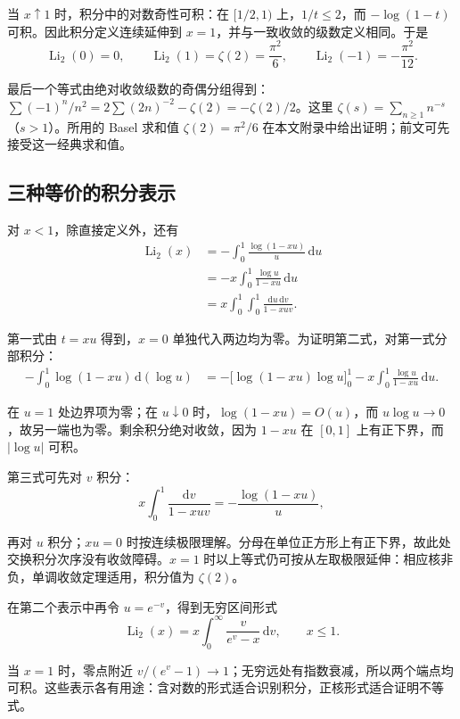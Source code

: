 \documentclass[11pt,a4paper]{article}
\begin{document}
当 \(x\uparrow1\) 时，积分中的对数奇性可积：在 \([1/2,1)\)
上，\(1/t\leqslant2\)，而 \(-\log(1-t)\) 可积。因此积分定义连续延伸到
\(x=1\)，并与一致收敛的级数定义相同。于是
\[
\operatorname{Li}_2(0)=0,\qquad
\operatorname{Li}_2(1)=\zeta(2)=\frac{\pi^2}{6},\qquad
\operatorname{Li}_2(-1)=-\frac{\pi^2}{12}.
\]

最后一个等式由绝对收敛级数的奇偶分组得到：\(\sum(-1)^n/n^2=2\sum(2n)^{-2}-\zeta(2)=-\zeta(2)/2\)。这里
\(\zeta(s)=\sum_{n\geqslant1}n^{-s}\)（\(s>1\)）。所用的 Basel 求和值
\(\zeta(2)=\pi^2/6\) 在本文附录中给出证明；前文可先接受这一经典求和值。

\hypertarget{ux4e09ux79cdux7b49ux4ef7ux7684ux79efux5206ux8868ux793a}{%
\subsection{三种等价的积分表示}\label{ux4e09ux79cdux7b49ux4ef7ux7684ux79efux5206ux8868ux793a}}

对 \(x<1\)，除直接定义外，还有
\[
\begin{aligned}
\operatorname{Li}_2(x)
&=-\int_0^1\frac{\log(1-xu)}u\,\mathrm du\\
&=-x\int_0^1\frac{\log u}{1-xu}\,\mathrm du\\
&=x\int_0^1\!\int_0^1\frac{\mathrm du\,\mathrm dv}{1-xuv}.
\end{aligned}
\]

第一式由 \(t=xu\) 得到，\(x=0\)
单独代入两边均为零。为证明第二式，对第一式分部积分：
\[
\begin{aligned}
-\int_0^1\log(1-xu)\,\mathrm d(\log u)
&=-\bigl[\log(1-xu)\log u\bigr]_0^1
-x\int_0^1\frac{\log u}{1-xu}\,\mathrm du.
\end{aligned}
\]

在 \(u=1\) 处边界项为零；在 \(u\downarrow0\) 时，\(\log(1-xu)=O(u)\)，而
\(u\log u\to0\)，故另一端也为零。剩余积分绝对收敛，因为 \(1-xu\) 在
\([0,1]\) 上有正下界，而 \(|\log u|\) 可积。

第三式可先对 \(v\) 积分：
\[
x\int_0^1\frac{\mathrm dv}{1-xuv}
=-\frac{\log(1-xu)}u,
\]

再对 \(u\) 积分；\(xu=0\)
时按连续极限理解。分母在单位正方形上有正下界，故此处交换积分次序没有收敛障碍。\(x=1\)
时以上等式仍可按从左取极限延伸：相应核非负，单调收敛定理适用，积分值为
\(\zeta(2)\)。

在第二个表示中再令 \(u=e^{-v}\)，得到无穷区间形式
\[
\operatorname{Li}_2(x)=x\int_0^{\infty}\frac{v}{e^v-x}\,\mathrm dv,
\qquad x\leqslant1.
\]

当 \(x=1\) 时，零点附近
\(v/(e^v-1)\to1\)；无穷远处有指数衰减，所以两个端点均可积。这些表示各有用途：含对数的形式适合识别积分，正核形式适合证明不等式。
\end{document}
